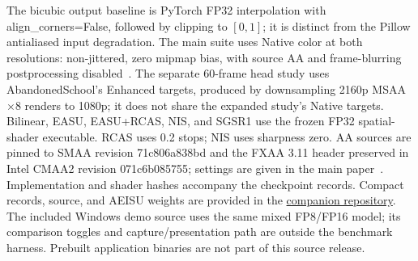 \documentclass[10pt,twocolumn,letterpaper]{article}
\begin{document}
The bicubic output baseline is PyTorch FP32 interpolation with \textnormal{align\_corners=False}, followed by clipping to $[0,1]$; it is distinct from the Pillow antialiased input degradation.
The main suite uses Native color at both resolutions: non-jittered, zero mipmap bias, with source AA and frame-blurring postprocessing disabled~\cite{mercier2023qrisp}.
The separate 60-frame head study uses AbandonedSchool's Enhanced targets, produced by downsampling 2160p MSAA$\times8$ renders to 1080p; it does not share the expanded study's Native targets.
Bilinear, EASU, EASU+RCAS, NIS, and SGSR1 use the frozen FP32 spatial-shader executable.
RCAS uses 0.2 stops; NIS uses sharpness zero.
AA sources are pinned to SMAA revision \textnormal{71c806a838bd} and the FXAA 3.11 header preserved in Intel CMAA2 revision \textnormal{071c6b085755}; settings are given in the main paper~\cite{jimenez2012smaa,lottes2011fxaa311}.
Implementation and shader hashes accompany the checkpoint records.
Compact records, source, and AEISU weights are provided in the \href{https://github.com/AELabs42/AEISU}{companion repository}.
The included Windows demo source uses the same mixed FP8/FP16 model; its comparison toggles and capture/presentation path are outside the benchmark harness. Prebuilt application binaries are not part of this source release.
\end{document}
